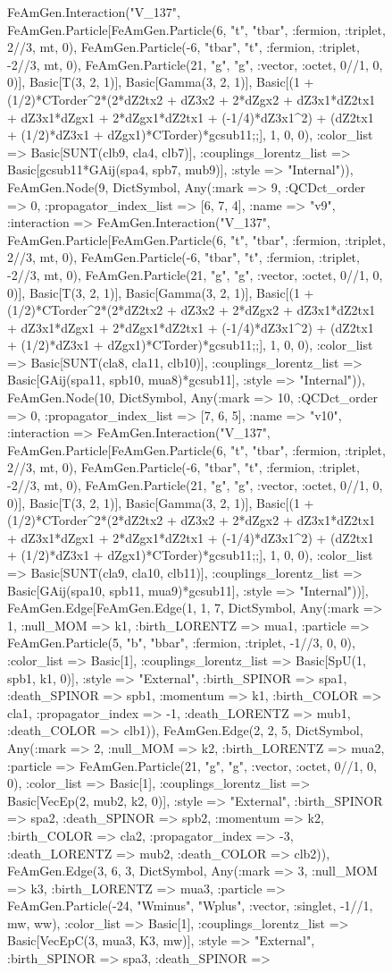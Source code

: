 \documentclass{revtex4}
\begin{document}
\begin{figure}[!htb]
\begin{center}
{FeAmGen.Interaction("V_137", FeAmGen.Particle[FeAmGen.Particle(6, "t", "tbar", :fermion, :triplet, 2//3, mt, 0), FeAmGen.Particle(-6, "tbar", "t", :fermion, :triplet, -2//3, mt, 0), FeAmGen.Particle(21, "g", "g", :vector, :octet, 0//1, 0, 0)], Basic[T(3, 2, 1)], Basic[Gamma(3, 2, 1)], Basic[(1 + (1/2)*CTorder^2*(2*dZ2tx2 + dZ3x2 + 2*dZgx2 + dZ3x1*dZ2tx1 + dZ3x1*dZgx1 + 2*dZgx1*dZ2tx1 + (-1/4)*dZ3x1^2) + (dZ2tx1 + (1/2)*dZ3x1 + dZgx1)*CTorder)*gcsub11;;], 1, 0, 0), :color_list => Basic[SUNT(clb9, cla4, clb7)], :couplings_lorentz_list => Basic[gcsub11*GAij(spa4, spb7, mub9)], :style => "Internal")), FeAmGen.Node(9, Dict{Symbol, Any}(:mark => 9, :QCDct_order => 0, :propagator_index_list => [6, 7, 4], :name => "v9", :interaction => FeAmGen.Interaction("V_137", FeAmGen.Particle[FeAmGen.Particle(6, "t", "tbar", :fermion, :triplet, 2//3, mt, 0), FeAmGen.Particle(-6, "tbar", "t", :fermion, :triplet, -2//3, mt, 0), FeAmGen.Particle(21, "g", "g", :vector, :octet, 0//1, 0, 0)], Basic[T(3, 2, 1)], Basic[Gamma(3, 2, 1)], Basic[(1 + (1/2)*CTorder^2*(2*dZ2tx2 + dZ3x2 + 2*dZgx2 + dZ3x1*dZ2tx1 + dZ3x1*dZgx1 + 2*dZgx1*dZ2tx1 + (-1/4)*dZ3x1^2) + (dZ2tx1 + (1/2)*dZ3x1 + dZgx1)*CTorder)*gcsub11;;], 1, 0, 0), :color_list => Basic[SUNT(cla8, cla11, clb10)], :couplings_lorentz_list => Basic[GAij(spa11, spb10, mua8)*gcsub11], :style => "Internal")), FeAmGen.Node(10, Dict{Symbol, Any}(:mark => 10, :QCDct_order => 0, :propagator_index_list => [7, 6, 5], :name => "v10", :interaction => FeAmGen.Interaction("V_137", FeAmGen.Particle[FeAmGen.Particle(6, "t", "tbar", :fermion, :triplet, 2//3, mt, 0), FeAmGen.Particle(-6, "tbar", "t", :fermion, :triplet, -2//3, mt, 0), FeAmGen.Particle(21, "g", "g", :vector, :octet, 0//1, 0, 0)], Basic[T(3, 2, 1)], Basic[Gamma(3, 2, 1)], Basic[(1 + (1/2)*CTorder^2*(2*dZ2tx2 + dZ3x2 + 2*dZgx2 + dZ3x1*dZ2tx1 + dZ3x1*dZgx1 + 2*dZgx1*dZ2tx1 + (-1/4)*dZ3x1^2) + (dZ2tx1 + (1/2)*dZ3x1 + dZgx1)*CTorder)*gcsub11;;], 1, 0, 0), :color_list => Basic[SUNT(cla9, cla10, clb11)], :couplings_lorentz_list => Basic[GAij(spa10, spb11, mua9)*gcsub11], :style => "Internal"))], FeAmGen.Edge[FeAmGen.Edge(1, 1, 7, Dict{Symbol, Any}(:mark => 1, :null_MOM => k1, :birth_LORENTZ => mua1, :particle => FeAmGen.Particle(5, "b", "bbar", :fermion, :triplet, -1//3, 0, 0), :color_list => Basic[1], :couplings_lorentz_list => Basic[SpU(1, spb1, k1, 0)], :style => "External", :birth_SPINOR => spa1, :death_SPINOR => spb1, :momentum => k1, :birth_COLOR => cla1, :propagator_index => -1, :death_LORENTZ => mub1, :death_COLOR => clb1)), FeAmGen.Edge(2, 2, 5, Dict{Symbol, Any}(:mark => 2, :null_MOM => k2, :birth_LORENTZ => mua2, :particle => FeAmGen.Particle(21, "g", "g", :vector, :octet, 0//1, 0, 0), :color_list => Basic[1], :couplings_lorentz_list => Basic[VecEp(2, mub2, k2, 0)], :style => "External", :birth_SPINOR => spa2, :death_SPINOR => spb2, :momentum => k2, :birth_COLOR => cla2, :propagator_index => -3, :death_LORENTZ => mub2, :death_COLOR => clb2)), FeAmGen.Edge(3, 6, 3, Dict{Symbol, Any}(:mark => 3, :null_MOM => k3, :birth_LORENTZ => mua3, :particle => FeAmGen.Particle(-24, "Wminus", "Wplus", :vector, :singlet, -1//1, mw, ww), :color_list => Basic[1], :couplings_lorentz_list => Basic[VecEpC(3, mua3, K3, mw)], :style => "External", :birth_SPINOR => spa3, :death_SPINOR => }
\end{center}
\end{figure}
\end{document}
